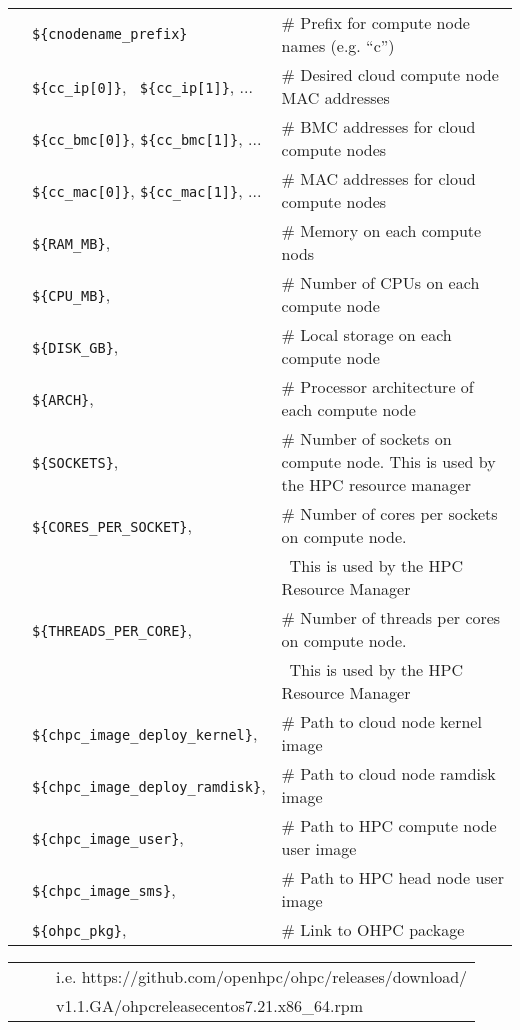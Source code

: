 \begin{tabular}{@{}>{\textbullet}l p{5.5cm} l}
& \texttt{\$\{cnodename\_prefix\}} & {\small \# Prefix for compute node names (e.g. ``c'')} \\
& \texttt{\$\{cc\_ip[0]\}}, \, \texttt{\$\{cc\_ip[1]\}}, ... & {\small \# Desired cloud compute node MAC addresses} \\
& \texttt{\$\{cc\_bmc[0]\}}, \texttt{\$\{cc\_bmc[1]\}}, ... & {\small \# BMC addresses for cloud compute nodes} \\
& \texttt{\$\{cc\_mac[0]\}}, \texttt{\$\{cc\_mac[1]\}}, ... & {\small \# MAC addresses for cloud compute nodes} \\
& \texttt{\$\{RAM\_MB\}}, & {\small \# Memory on each compute nods} \\
& \texttt{\$\{CPU\_MB\}}, & {\small \# Number of CPUs on each compute node} \\
& \texttt{\$\{DISK\_GB\}}, & {\small \# Local storage on each compute node} \\
& \texttt{\$\{ARCH\}}, & {\small \# Processor architecture of each compute node} \\
& \texttt{\$\{SOCKETS\}}, & {\small \# Number of sockets  on compute node. This is used by the HPC resource manager} \\
& \texttt{\$\{CORES\_PER\_SOCKET\}}, & {\small \# Number of cores per sockets  on compute node. } \\
& \texttt{} & {\small \    This is used by the HPC Resource Manager } \\
& \texttt{\$\{THREADS\_PER\_CORE\}}, & {\small \# Number of threads per cores on compute node. } \\
& \texttt{} & {\small \    This is used by the HPC Resource Manager } \\
& \texttt{\$\{chpc\_image\_deploy\_kernel\}}, & {\small \# Path to cloud node kernel image } \\
& \texttt{\$\{chpc\_image\_deploy\_ramdisk\}}, & {\small \# Path to cloud node ramdisk image } \\
& \texttt{\$\{chpc\_image\_user\}}, & {\small \# Path to HPC compute node user image } \\
& \texttt{\$\{chpc\_image\_sms\}}, & {\small \# Path to HPC head node user image } \\
& \texttt{\$\{ohpc\_pkg\}}, & {\small \# Link to OHPC package } \\
\end{tabular}
\begin{tabular}{@{}>{}l p{7cm} l}
& \texttt{} & {\small \ 	i.e. https://github.com/openhpc/ohpc/releases/download/ } \\
& \texttt{} & {\small \ 	v1.1.GA/ohpc\-release\-centos7.2\-1.1\-1.x86\_64.rpm } \\
\end{tabular}

